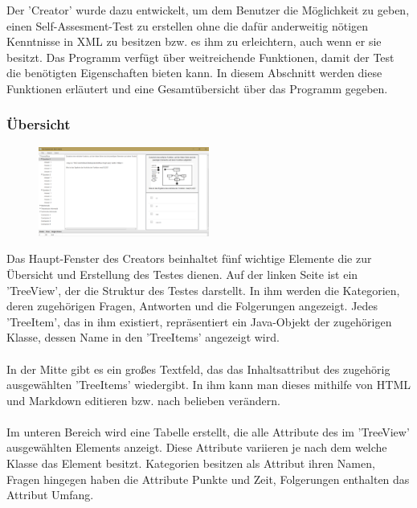 \label{Julian}

Der 'Creator' wurde dazu entwickelt, um dem Benutzer die Möglichkeit zu geben, einen Self-Assesment-Test zu erstellen ohne die dafür anderweitig nötigen Kenntnisse in XML zu besitzen bzw. es ihm zu erleichtern, auch wenn er sie besitzt. Das Programm verfügt über weitreichende Funktionen, damit der Test die benötigten Eigenschaften bieten kann. In diesem Abschnitt werden diese Funktionen erläutert und eine Gesamtübersicht über das Programm gegeben. 

\subsubsection*{Übersicht}
\begin{figure}[htbp] 
  \centering
     \includegraphics[width=0.5\textwidth]{Julian_Images/Creator-Uebersicht.png}
  \caption{}
  \label{fig:Bild0}
\end{figure}
Das Haupt-Fenster des Creators beinhaltet fünf wichtige Elemente die zur Übersicht und Erstellung des Testes dienen. Auf der linken Seite ist ein 'TreeView', der die Struktur des Testes darstellt. In ihm werden die Kategorien, deren zugehörigen Fragen, Antworten und die Folgerungen angezeigt. Jedes 'TreeItem', das in ihm existiert, repräsentiert ein Java-Objekt der zugehörigen Klasse, dessen Name in den 'TreeItems' angezeigt wird.
\\
\\
In der Mitte gibt es ein großes Textfeld, das das Inhaltsattribut des zugehörig ausgewählten 'TreeItems' wiedergibt. In ihm kann man dieses mithilfe von HTML und Markdown editieren bzw. nach belieben verändern.
\\
\\
Im unteren Bereich wird eine Tabelle erstellt, die alle Attribute des im 'TreeView'  ausgewählten Elements anzeigt. Diese Attribute variieren je nach dem welche Klasse das Element besitzt. Kategorien besitzen als Attribut ihren Namen, Fragen hingegen haben die Attribute Punkte und Zeit, Folgerungen enthalten das Attribut Umfang.
\\
\\
